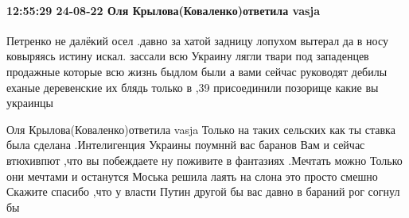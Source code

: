  
 
 
 
 

\paragraph{12:55:29 24-08-22 Оля Крылова(Коваленко)ответила vasja}

Петренко не далёкий осел .давно за хатой задницу лопухом вытерал да в носу ковыряясь истину искал. зассали всю Украину лягли твари под западенцев продажные которые всю жизнь быдлом были а вами сейчас руководят дебилы еханые деревенские их блядь только в ,39 присоединили позорище какие вы украинцы

Оля Крылова(Коваленко)ответила vasja
Только на таких сельских как ты ставка была сделана .Интелигенция Украины поумннй вас баранов
Вам и сейчас втюхивпют ,что вы побеждаете ну поживите в фантазиях .Мечтать можно
Только они мечтами и останутся Моська решила лаять на слона это просто смешно Скажите спасибо ,что у власти Путин другой бы вас давно в бараний рог согнул бы
